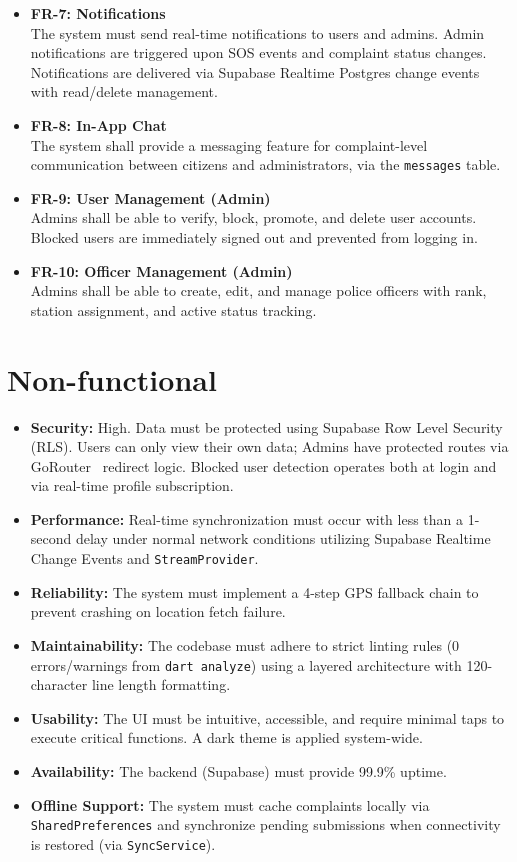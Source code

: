 \documentclass[12pt, a4paper, twoside, openany]{report}
\begin{document}
\begin{itemize}[label={}, itemsep=1em]
    \item \textbf{FR-7: Notifications}\\
    The system must send real-time notifications to users and admins. Admin notifications are triggered upon SOS events and complaint status changes. Notifications are delivered via Supabase Realtime Postgres change events with read/delete management.
    \item \textbf{FR-8: In-App Chat}\\
    The system shall provide a messaging feature for complaint-level communication between citizens and administrators, via the \texttt{messages} table.
    \item \textbf{FR-9: User Management (Admin)}\\
    Admins shall be able to verify, block, promote, and delete user accounts. Blocked users are immediately signed out and prevented from logging in.
    \item \textbf{FR-10: Officer Management (Admin)}\\
    Admins shall be able to create, edit, and manage police officers with rank, station assignment, and active status tracking.
\end{itemize}
\section{Non-functional}
\begin{itemize}[label={}, itemsep=1em]
    \item \textbf{Security:} High. Data must be protected using Supabase Row Level Security (RLS). Users can only view their own data; Admins have protected routes via GoRouter~\cite{gorouter} redirect logic. Blocked user detection operates both at login and via real-time profile subscription.
    \item \textbf{Performance:} Real-time synchronization must occur with less than a 1-second delay under normal network conditions utilizing Supabase Realtime Change Events and \texttt{StreamProvider}.
    \item \textbf{Reliability:} The system must implement a 4-step GPS fallback chain to prevent crashing on location fetch failure.
    \item \textbf{Maintainability:} The codebase must adhere to strict linting rules (0 errors/warnings from \texttt{dart analyze}) using a layered architecture with 120-character line length formatting.
    \item \textbf{Usability:} The UI must be intuitive, accessible, and require minimal taps to execute critical functions. A dark theme is applied system-wide.
    \item \textbf{Availability:} The backend (Supabase) must provide 99.9\% uptime.
    \item \textbf{Offline Support:} The system must cache complaints locally via \texttt{SharedPreferences} and synchronize pending submissions when connectivity is restored (via \texttt{SyncService}).
\end{itemize}
\end{document}
